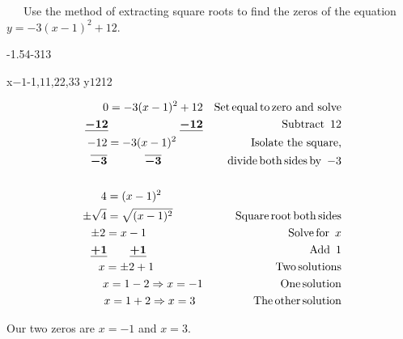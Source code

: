 \begin{example}~~~Use the method of extracting square roots to find the zeros of the equation $y = -3(x-1)^2+12$.\\

\begin{vwcol}[widths={0.25,0.75},sep=.5cm, justify=flush,rule=0pt,indent=1em]
\begin{mfpic}%
[14]{-1.5}{4}{-3}{13}
\arrow \reverse \arrow {}
\axes
{}

\axislabels x{{$-1$}-1,{$1$}1,{$2$}2,{$3$}3 }
\axislabels y{{$12$}12}%
\end{mfpic}

\begin{eqnarray*}
    \ 0 = -3(x-1)^2+12 &  &  \operatorname{Set} \operatorname{equal} \operatorname{to} \operatorname{zero~and~solve}\\
    \ \boldsymbol{\underline{-12}~~~~~~~~~~~~~~~~~~~\underline{-12}}    & & \operatorname{Subtract~}12\\
		\ -12 = -3(x-1)^2~~~~~~~ & &  \text{Isolate~the~square,}\\
		\ \boldsymbol{\overline{-3}~~~~~~~~~~\overline{-3}}~~~~~~~~~~~ & & ~~~\operatorname{divide} \operatorname{both} \operatorname{sides} \operatorname{by~}-3\\
		\ &&\\
		\ 4 = (x-1)^2~~~~~~~~~~~ & &\\
		\ \pm\sqrt{4} = \sqrt{(x-1)^2}~~~~~~~~ & & \operatorname{Square} \operatorname{root} \operatorname{both} \operatorname{sides}\\
		\ \pm2 = x - 1~~~~~~~~~~~~~~~  & &  \operatorname{Solve} \operatorname{for~} x\\
		\ \boldsymbol{\underline{+1}~~~~~~\underline{+1}}~~~~~~~~~~~~~~~  & &  \operatorname{Add~}1\\
		\ x=\pm2 +1~~~~~~~~~~~~~ & & \operatorname{Two} \operatorname{solutions} \\
		\ x=1 - 2 \Rightarrow x = -1  & & \operatorname{One} \operatorname{solution}\\
		\ x=1 + 2 \Rightarrow x = 3~~  & & \operatorname{The} \operatorname{other} \operatorname{solution}\\
  \end{eqnarray*}
\end{vwcol}
Our two zeros are $x=-1$ and $x=3$.
\end{example}


